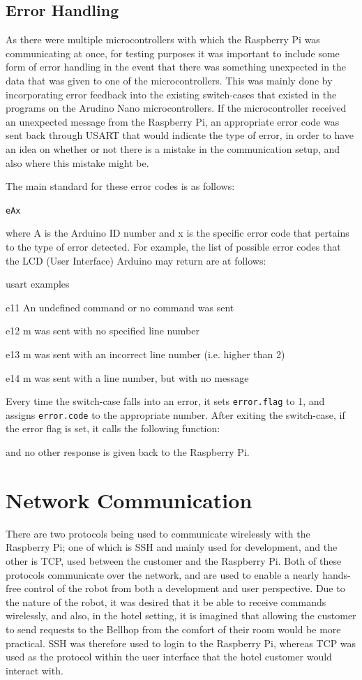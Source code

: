 \documentclass[11pt]{article}
\begin{document}
\subsection*{Error Handling} \label{errhand}
As there were multiple microcontrollers with which the Raspberry Pi was communicating at once, for testing purposes it was important to include some form of error handling in the event that there was something unexpected in the data that was given to one of the microcontrollers.
This was mainly done by incorporating error feedback into the existing switch-cases that existed in the programs on the Arudino Nano microcontrollers. If the microcontroller received an unexpected message from the Raspberry Pi, an appropriate error code was sent back through USART that would indicate the type of error, in order to have an idea on whether or not there is a mistake in the communication setup, and also where this mistake might be. 

The main standard for these error codes is as follows:

\begin{center}
	\texttt{eAx}
\end{center}

where A is the Arduino ID number and x is the specific error code that pertains to the type of error detected. For example, the list of possible error codes that the LCD (User Interface) Arduino may return are at follows:
\begin{labeling}{usart examples}
\item [e11] An undefined command or no command was sent
\item [e12] m was sent with no specified line number
\item [e13] m was sent with an incorrect line number (i.e. higher than 2)
\item [e14] m was sent with a line number, but with no message
\end{labeling}
Every time the switch-case falls into an error, it sets \texttt{error.flag} to 1, and assigns \texttt{error.code} to the appropriate number. After exiting the switch-case, if the error flag is set, it calls the following function:

and no other response is given back to the Raspberry Pi.
\newpage
\section{Network Communication}
There are two protocols being used to communicate wirelessly with the Raspberry Pi; one of which is SSH and mainly used for development, and the other is TCP, used between the customer and the Raspberry Pi. Both of these protocols communicate over the network, and are used to enable a nearly hands-free control of the robot from both a development and user perspective. Due to the nature of the robot, it was desired that it be able to receive commands wirelessly, and also, in the hotel setting, it is imagined that allowing the customer to send requests to the Bellhop from the comfort of their room would be more practical. SSH was therefore used to login to the Raspberry Pi, whereas TCP was used as the protocol within the user interface that the hotel customer would interact with.
\end{document}
